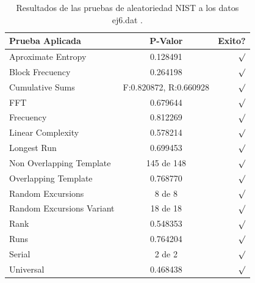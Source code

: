 \documentclass[10pt]{IEEEtran}
\begin{document}
\begin{table}[H]
\caption{Resultados de las pruebas de aleatoriedad NIST a los datos ej6.dat .}
\label{caso1}
\begin{center}
\begin{small}
\begin{tabular}{|l|c|r|}
\hline

Prueba Aplicada &  P-Valor & Exito? \\
\hline

Aproximate Entropy    &    0.128491  & $\surd$ \\

Block Frecuency  & 0.264198  &  $\surd$  \\

Cumulative Sums    &   F:0.820872, R:0.660928 & $\surd$ \\

FFT    &   0.679644  &  $\surd$     \\

Frecuency     &  0.812269  &  $\surd$   \\

Linear Complexity      & 0.578214 & $\surd$ \\

Longest Run      &   0.699453 &    $\surd$      \\

Non Overlapping Template      & 145 de 148    &     $\surd$          \\

Overlapping Template      &   0.768770  &      $\surd$      \\

Random Excursions      & 8 de 8  &    $\surd$      \\

Random Excursions Variant & 18 de 18 &     $\surd$    \\

Rank & 0.548353 &      $\surd$      \\

Runs &    0.764204  &     $\surd$        \\

Serial &     2 de 2    &     $\surd$        \\

Universal &    0.468438  &   $\surd$            \\

\hline

\end{tabular}
\end{small}
\end{center}
\end{table}
\end{document}
